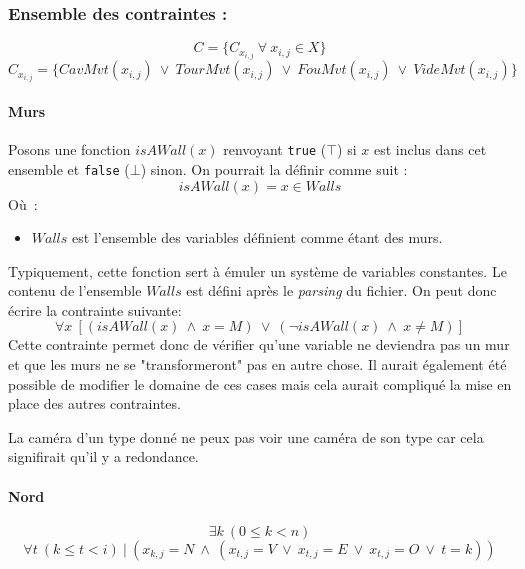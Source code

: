 \documentclass[a4paper,11pt]{article}
\newcommand{\AND}{~\wedge~}
\newcommand{\OR}{~\vee~}
\newcommand{\TQ}{~|~}
\begin{document}
      \subsubsection{Ensemble des contraintes :}

          \[C = \{C_{x_{i, j}}~\forall~x_{i, j} \in X\}\]
          \[C_{x_{i, j}} = \{CavMvt(x_{i, j}) \OR TourMvt(x_{i, j}) \OR FouMvt(x_{i, j}) \OR VideMvt(x_{i, j})\}\]

          \paragraph{Murs}
              Posons une fonction $isAWall(x)$ renvoyant \verb|true| ($\top$) si $x$ est inclus dans cet ensemble et \verb|false| ($\bot$) sinon. On pourrait la définir comme suit :
              \[isAWall(x) = x \in Walls\] %
              Où~:
              \begin{itemize}
                \item $Walls$ est l'ensemble des variables définient comme étant des murs.
              \end{itemize}
              Typiquement, cette fonction sert à émuler un système de variables constantes. Le contenu de l'ensemble $Walls$ est défini après le \textit{parsing} du fichier.  On peut donc écrire la contrainte suivante:
              \[\forall x~[(isAWall(x) \AND x = M) \OR (\neg isAWall(x) \AND x \neq M)] \]
              Cette contrainte permet donc de vérifier qu'une variable ne deviendra pas un mur et que les murs ne se "transformeront" pas en autre chose.  Il aurait également été possible de modifier le domaine de ces cases mais cela aurait compliqué la mise en place des autres contraintes.\\
              
          \begin{tcolorbox}[title= Remarque~:]
            La caméra d'un type donné ne peux pas voir une caméra de son type car cela signifirait qu'il y a redondance.
          \end{tcolorbox}

          \paragraph{Nord}
              \[ \exists k~(0 \leq k < n) \]
              \[ \forall t~(k \leq t < i) \TQ (x_{k, j} = N \AND (x_{t, j} = V \OR x_{t, j} = E \OR x_{t, j} = O \OR t = k)) \]
\end{document}
